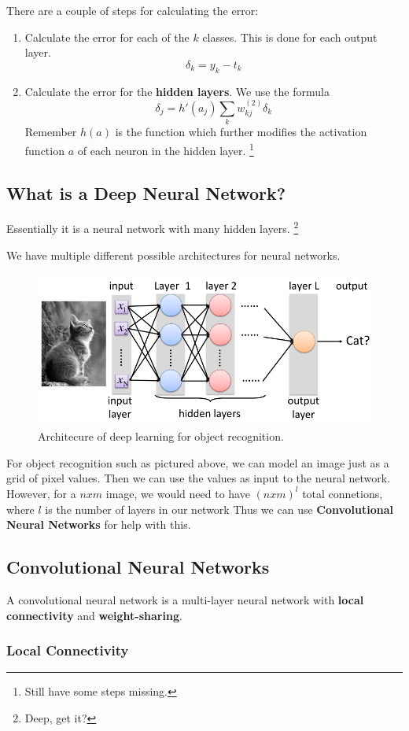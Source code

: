 \documentclass{tufte-handout}
\begin{document}
There are a couple of steps for calculating the error:
\begin{enumerate}
	\item Calculate the error for each of the $k$ classes. This is done for each output layer.
			\[ \delta_{k} = y_{k} - t_{k}\]
	\item Calculate the error for the \textbf{hidden layers}. We use the formula
			\[ \delta_{j} = h'(a_{j})\sum_{k}^{}w_{kj}^{(2)}\delta_{k}\]
				Remember $h(a)$ is the function which further modifies the activation function $a$ of
				each neuron in the hidden layer.
				\footnote{Still have some steps missing.}
\end{enumerate}
\subsection{What is a Deep Neural Network?}
Essentially it is a neural network with many hidden layers.
\footnote{Deep, get it?}

We have multiple different possible architectures for neural networks.
\begin{centering}
\begin{figure}
		\includegraphics[scale=0.3]{obj_recognition}
		\caption{Architecure of deep learning for object recognition.}
\end{figure}
\end{centering}
For object recognition such as pictured above, we can model an image just as a grid of pixel values.
Then we can use the values as input to the neural network. 
However, for a $n x m$ image, we would need to have $(n x m)^{l}$ total connetions, where $l$ is
	the number of layers in our network
Thus we can use \textbf{Convolutional Neural Networks} for help with this.

\subsection{Convolutional Neural Networks}
A convolutional neural network is a multi-layer neural network with \textbf{local connectivity}
	and \textbf{weight-sharing}.
	\subsubsection{Local Connectivity}
\end{document}
